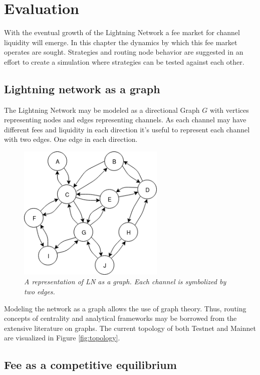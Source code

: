 \chapter{Evaluation}

With the eventual growth of the Lightning Network a fee market for channel liquidity will emerge. In this chapter the dynamics by which this fee market operates are sought. Strategies and routing \gls{node} behavior are suggested in an effort to create a simulation where strategies can be tested against each other. 

\section{Lightning network as a graph}

The Lightning Network may be modeled as a directional Graph $G$ with vertices representing nodes and edges representing channels. As each channel may have different fees and liquidity in each direction it's useful to represent each channel with two edges. One edge in each direction. 

\begin{figure}[!htb]
	\hspace*{-0.7cm} 
	\centering
	\includegraphics[width=7cm]{images/LN_overview.png}
	\caption{ \textit{A representation of LN as a graph. Each channel is symbolized by two edges.} 
	}
	\label{fig:ln:graph}
	\hspace*{2mm}
\end{figure}

Modeling the network as a graph allows the use of graph theory. Thus, routing concepts of centrality and analytical frameworks may be borrowed from the extensive literature on graphs. The current topology of both Testnet and Mainnet are visualized in Figure \ref{fig:topology}.

\section{Fee as a competitive equilibrium}

